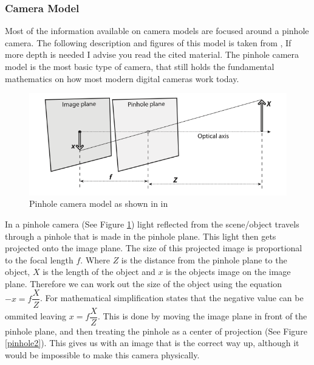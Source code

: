 \documentclass[11pt,oneside]{report}
\begin{document}
				\subsubsection{Camera Model}
				Most of the information available on camera models are focused around a pinhole camera.
				The following description and figures of this model is taken from , If more depth is needed I advise you read the cited material.
				The pinhole camera model is the most basic type of camera, that still holds the fundamental mathematics on how most modern digital cameras work today.
				\begin{figure}[!ht]
				\begin{center}
					\includegraphics[scale=0.5]{pinhole}
					\caption{Pinhole camera model as shown in in \protect{} {\label{pinhole}}}
				\end{center}
				\end{figure}
				In a pinhole camera (See Figure \ref{pinhole}) light reflected from the scene/object travels through a pinhole that is made in the pinhole plane.
				This light then gets projected onto the image plane.
				The size of this projected image is proportional to the focal length $f$.
				Where $Z$ is the distance from the pinhole plane to the object, $X$ is the length of the object and $x$ is the objects image on the image plane.
				Therefore we can work out the size of the object using the equation $-x=f\dfrac{X}{Z}$.
				For mathematical simplification  states that the negative value can be ommited leaving $x=f\dfrac{X}{Z}$.
				This is done by moving the image plane in front of the pinhole plane, and then treating the pinhole as a center of projection (See Figure \ref{pinhole2}).
				This gives us with an image that is the correct way up, although it would be impossible to make this camera physically.
\end{document}
